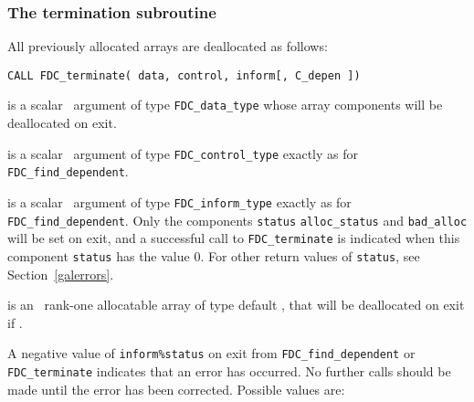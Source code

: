 \documentclass{galahad}
\newcommand{\packagename}{FDC}
\begin{document}

\subsubsection{The  termination subroutine}
All previously allocated arrays are deallocated as follows:
\vspace*{1mm}

\hspace{8mm}
{\tt CALL \packagename\_terminate( data, control, inform[, C\_depen ])}

\vspace*{-1mm}
\begin{description}

 is a scalar \intentinout\ argument of type
{\tt \packagename\_data\_type} whose array components will be deallocated
on exit.

 is a scalar \intentin\ argument of type
{\tt \packagename\_control\_type}
exactly as for
{\tt \packagename\_find\_dependent}.

 is a scalar \intentinout\ argument of type
{\tt \packagename\_inform\_type}
exactly as for
{\tt \packagename\_find\_dependent}.
Only the components {\tt status}
{\tt alloc\_status} and {\tt bad\_alloc}
will be set on exit, and a
successful call to
{\tt \packagename\_terminate}
is indicated when this  component {\tt status} has the value 0.
For other return values of {\tt status}, see Section~\ref{galerrors}.

 is an \optional\ rank-one allocatable array of type default
\integer, that will be deallocated on exit if \present.

\end{description}


\galerrors
A negative value of {\tt inform\%status} on exit from
{\tt \packagename\_find\_dependent}
or
{\tt \packagename\_terminate}
indicates that an error has occurred. No further calls should be made
until the error has been corrected. Possible values are:
\end{document}
